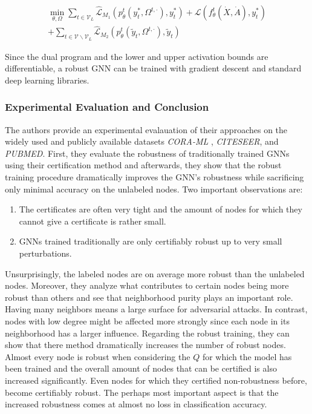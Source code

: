 \documentclass[a4paper,preprint]{sig-alternate}
\begin{document}
\begin{multline}
\label{eq:3}
    \min_{\theta, \Omega} \sum_{t \in \mathcal{V}_L} \mathcal{\hat{L}}_{M_1} (p_{\theta}^t (y_t^{\ast}, \Omega^{t, \cdot}), y_t^{\ast}) + \mathcal{L} (f_{\theta}^t (\dot{X}, \dot{A}), y_t^{\ast}) \\
    + \sum_{t \in \mathcal{V} \backslash \mathcal{V}_L} \mathcal{\hat{L}}_{M_2} (p_{\theta}^t (\tilde{y}_t, \Omega^{t, \cdot}), \tilde{y}_t)
\end{multline}

Since the dual program and the lower and upper activation bounds are differentiable, a robust GNN can be trained with gradient descent 
and standard deep learning libraries.

\subsubsection{Experimental Evaluation and Conclusion}

The authors provide an experimental evalauation of their approaches on the widely used and publicly available datasets \textit{CORA-ML}
, \textit{CITESEER}, and \textit{PUBMED}. First, they evaluate the robustness of traditionally trained GNNs using their certification method and
afterwards, they show that the robust training procedure dramatically improves the GNN's robustness while sacrificing
only minimal accuracy on the unlabeled nodes. Two important observations are:
\begin{enumerate}
    \item The certificates are often very tight and the amount of nodes for which they cannot give a certificate is rather small.
    \item GNNs trained traditionally are only certifiably robust up to very small perturbations.
\end{enumerate}
Unsurprisingly, the labeled nodes are on average more robust than the unlabeled nodes. Moreover, they analyze what contributes to certain
nodes being more robust than others and see that neighborhood purity plays an important role. Having many neighbors means a large 
surface for adversarial attacks. In contrast, nodes with low degree might be affected more strongly since each node in its neighborhood
has a larger influence.\newline
Regarding the robust training, they can show that there method dramatically increases the number of robust nodes. Almost every node
is robust when considering the $Q$ for which the model has been trained and the overall amount of nodes that can be certified is also 
increased significantly. Even nodes for which they certified non-robustness before, become certifiably robust.
The perhaps most important aspect is that the increased robustness comes at almost no loss in classification accuracy.
\end{document}
